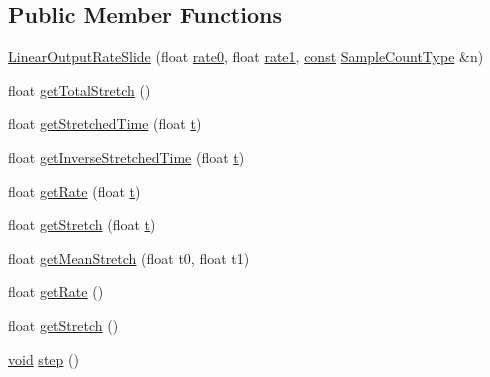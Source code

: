 \subsection*{Public Member Functions}
\begin{DoxyCompactItemize}
\item 
\hyperlink{class__sbsms___1_1_linear_output_rate_slide_a2730df7df8d82f9b2f4326b94fbda91b}{Linear\+Output\+Rate\+Slide} (float \hyperlink{class__sbsms___1_1_linear_output_rate_slide_ae1501925a9805342f8da4b3631cb6e6d}{rate0}, float \hyperlink{class__sbsms___1_1_linear_output_rate_slide_a3e0bc730b2a18d5e4c3d55baa783fdb7}{rate1}, \hyperlink{getopt1_8c_a2c212835823e3c54a8ab6d95c652660e}{const} \hyperlink{namespace__sbsms___ae4ba47977e7e07f5945e529e2256b662}{Sample\+Count\+Type} \&n)
\item 
float \hyperlink{class__sbsms___1_1_linear_output_rate_slide_a6d9b2bdb99180f70e346c36e293fd61c}{get\+Total\+Stretch} ()
\item 
float \hyperlink{class__sbsms___1_1_linear_output_rate_slide_ad6abf879b9caddcfc2603520ebea8193}{get\+Stretched\+Time} (float \hyperlink{octave__test_8m_aaccc9105df5383111407fd5b41255e23}{t})
\item 
float \hyperlink{class__sbsms___1_1_linear_output_rate_slide_ac6df6c0a2bbbd77d536815b47e10e9a4}{get\+Inverse\+Stretched\+Time} (float \hyperlink{octave__test_8m_aaccc9105df5383111407fd5b41255e23}{t})
\item 
float \hyperlink{class__sbsms___1_1_linear_output_rate_slide_a42fedebd9f579bd2042b1582d78e06d2}{get\+Rate} (float \hyperlink{octave__test_8m_aaccc9105df5383111407fd5b41255e23}{t})
\item 
float \hyperlink{class__sbsms___1_1_linear_output_rate_slide_ac8c3b105771ddbc10e2992053b72747c}{get\+Stretch} (float \hyperlink{octave__test_8m_aaccc9105df5383111407fd5b41255e23}{t})
\item 
float \hyperlink{class__sbsms___1_1_linear_output_rate_slide_afa7de42436cfdad36e7287f4106b3ae3}{get\+Mean\+Stretch} (float t0, float t1)
\item 
float \hyperlink{class__sbsms___1_1_linear_output_rate_slide_a7d1c6a7ed6e31de63d7a1d3589948628}{get\+Rate} ()
\item 
float \hyperlink{class__sbsms___1_1_linear_output_rate_slide_af74a74588761efa2ccce543ea49bbc2f}{get\+Stretch} ()
\item 
\hyperlink{sound_8c_ae35f5844602719cf66324f4de2a658b3}{void} \hyperlink{class__sbsms___1_1_linear_output_rate_slide_a8786678b05dba5a218b983a0f2033671}{step} ()
\end{DoxyCompactItemize}
